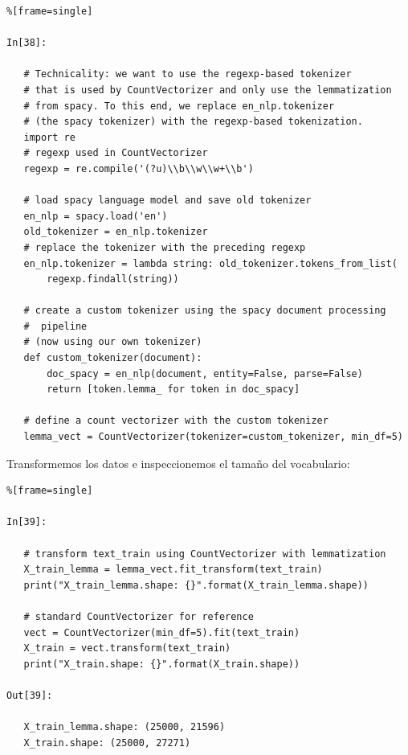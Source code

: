 \begin{lstlisting}%[frame=single]

In[38]:

   # Technicality: we want to use the regexp-based tokenizer
   # that is used by CountVectorizer and only use the lemmatization
   # from spacy. To this end, we replace en_nlp.tokenizer 
   # (the spacy tokenizer) with the regexp-based tokenization.
   import re
   # regexp used in CountVectorizer
   regexp = re.compile('(?u)\\b\\w\\w+\\b')
   
   # load spacy language model and save old tokenizer
   en_nlp = spacy.load('en')
   old_tokenizer = en_nlp.tokenizer
   # replace the tokenizer with the preceding regexp
   en_nlp.tokenizer = lambda string: old_tokenizer.tokens_from_list(
       regexp.findall(string))
   
   # create a custom tokenizer using the spacy document processing
   #  pipeline
   # (now using our own tokenizer)
   def custom_tokenizer(document):
       doc_spacy = en_nlp(document, entity=False, parse=False)
       return [token.lemma_ for token in doc_spacy]
       
   # define a count vectorizer with the custom tokenizer
   lemma_vect = CountVectorizer(tokenizer=custom_tokenizer, min_df=5)

\end{lstlisting}

Transformemos los datos e inspeccionemos el tamaño del vocabulario:

\begin{lstlisting}%[frame=single]

In[39]:

   # transform text_train using CountVectorizer with lemmatization
   X_train_lemma = lemma_vect.fit_transform(text_train)
   print("X_train_lemma.shape: {}".format(X_train_lemma.shape))
   
   # standard CountVectorizer for reference
   vect = CountVectorizer(min_df=5).fit(text_train)
   X_train = vect.transform(text_train)
   print("X_train.shape: {}".format(X_train.shape))

Out[39]:

   X_train_lemma.shape: (25000, 21596)
   X_train.shape: (25000, 27271)

\end{lstlisting}

